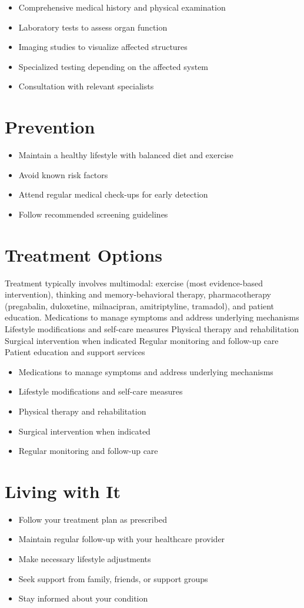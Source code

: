 \begin{itemize}[noitemsep]
  \item Comprehensive medical history and physical examination
  \item Laboratory tests to assess organ function
  \item Imaging studies to visualize affected structures
  \item Specialized testing depending on the affected system
  \item Consultation with relevant specialists
\end{itemize}
\section{Prevention}
\begin{itemize}[noitemsep]
  \item Maintain a healthy lifestyle with balanced diet and exercise
  \item Avoid known risk factors
  \item Attend regular medical check-ups for early detection
  \item Follow recommended screening guidelines
\end{itemize}
\section{Treatment Options}
Treatment typically involves multimodal: exercise (most evidence-based intervention), thinking and memory-behavioral therapy, pharmacotherapy (pregabalin, duloxetine, milnacipran, amitriptyline, tramadol), and patient education. Medications to manage symptoms and address underlying mechanisms Lifestyle modifications and self-care measures Physical therapy and rehabilitation Surgical intervention when indicated Regular monitoring and follow-up care Patient education and support services

\begin{itemize}[noitemsep]
  \item Medications to manage symptoms and address underlying mechanisms
  \item Lifestyle modifications and self-care measures
  \item Physical therapy and rehabilitation
  \item Surgical intervention when indicated
  \item Regular monitoring and follow-up care
\end{itemize}
\section{Living with It}
\begin{itemize}[noitemsep]
  \item Follow your treatment plan as prescribed
  \item Maintain regular follow-up with your healthcare provider
  \item Make necessary lifestyle adjustments
  \item Seek support from family, friends, or support groups
  \item Stay informed about your condition
\end{itemize}
